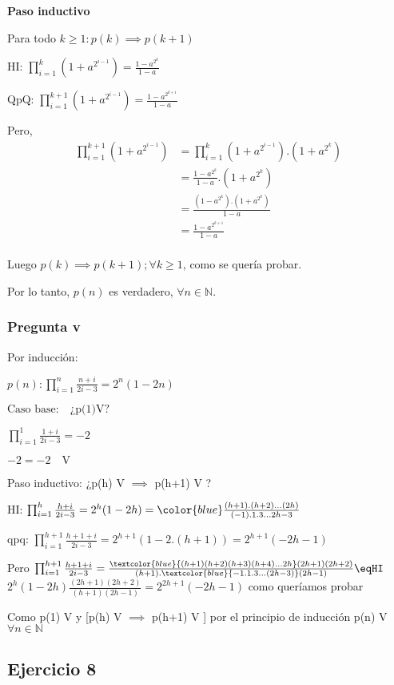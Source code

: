 \textbf{Paso inductivo}

Para todo $k \geq 1: p(k) \implies p(k+1)$

HI: $\prod_{i=1}^{k}\left(1+a^{2^{i-1}}\right)= \frac{1-a^{2^k}}{1-a}$

QpQ: $\prod_{i=1}^{k+1}\left(1+a^{2^{i-1}}\right)= \frac{1-a^{2^{k+1}}}{1-a}$

Pero,
\begin{align*}
    \prod_{i=1}^{k+1}\left(1+a^{2^{i-1}}\right) &= \prod_{i=1}^{k}\left(1+a^{2^{i-1}}\right) . (1+a^{2^k}) \\
    &= \frac{1-a^{2^k}}{1-a} . (1+a^{2^k}) \\
    &= \frac{\left(1-a^{2^k}\right).\left(1+a^{2^k}\right)}{1-a} \\
    &= \frac{1-a^{2^{k+1}}}{1-a} \\
\end{align*}

Luego $p(k) \implies p(k+1); \forall k \geq 1$, como se quería probar.

Por lo tanto, $p(n)$ es verdadero, $\forall n \in \mathbb{N}$.

\subsubsection{Pregunta v}
Por inducción:

$p(n): \prod_{i=1}^{n}\frac{n+i}{2i-3} = 2^n(1-2n) $

$\text{Caso base:}\quad \text{¿p(1)V?} $

$\prod_{i=1}^{1}\frac{1+i}{2i-3} = -2$

$-2=-2 \quad \text{V} $

Paso inductivo: ¿p(h) V $\implies$ p(h+1) V ? 

HI:  $ \prod_{i=1}^{ h}\frac{ h+i}{2i-3} = 2^ h(1-2 h) = \color{blue} \frac{(h+1).(h+2)\ldots(2h)}{(-1).1.3\ldots 2h-3}$

qpq:
$\prod_{i=1}^{  h+1}\frac{  h+1+i}{2i-3} = 2^{h+1}(1-2.(h+1))=2^{h+1}(-2h-1)$


Pero $\prod_{i=1}^{  h+1}\frac{  h+1+i}{2i-3} = \frac{\textcolor{blue}{(h+1)(h+2)(h+3)(h+4)\ldots2h}(2h+1)(2h+2)}{(h+1).\textcolor{blue}{-1.1.3\ldots(2h-3)}(2h-1)} \eqHI$
$2^h(1-2h)\frac{(2h+1)(2h+2)}{(h+1)(2h-1)} = 2^{2h+1}(-2h-1)$ como queríamos probar

Como p(1) V y [p(h) V $\implies$ p(h+1) V ] por el principio de inducción p(n) V $\forall n \in \mathbb N$

\subsection{Ejercicio 8}

